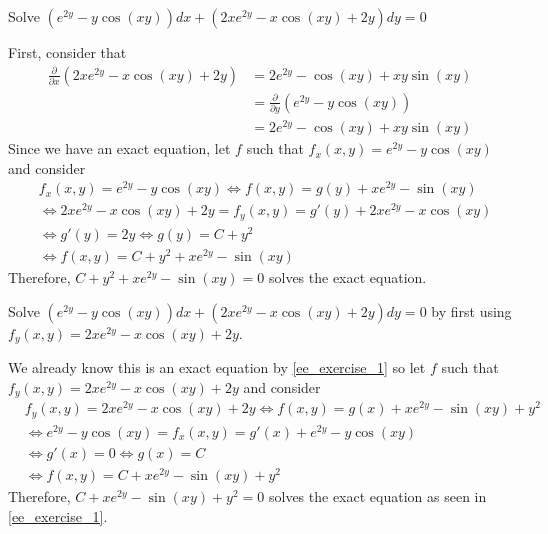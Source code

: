 \documentclass[notes]{subfiles}
\begin{document}
\begin{exercise} \label{ee_exercise_1}
    Solve $(e^{2y} - y\cos(xy))dx + (2xe^{2y} - x\cos(xy) + 2y)dy = 0$
\end{exercise}
\begin{solution}
    First, consider that
    \begin{align*}
        \frac{\partial}{\partial x} (2xe^{2y} - x\cos(xy) + 2y)
        &= 2e^{2y} - \cos(xy) + xy\sin(xy) \\
        &= \frac{\partial}{\partial y} (e^{2y} - y\cos(xy)) \\
        &= 2e^{2y} - \cos(xy) + xy\sin(xy)
    \end{align*}
    Since we have an exact equation, let $f$ such that $f_x(x, y) = e^{2y} - y\cos(xy)$ and consider
    \begin{align*}
        &f_x(x, y) = e^{2y} - y\cos(xy)
        \iff f(x, y) = g(y) + x e^{2y} - \sin(xy) \\
        &\iff 2xe^{2y} - x\cos(xy) + 2y = f_y(x, y) = g'(y) + 2x e^{2y} - x\cos(xy) \\
        &\iff g'(y) = 2y
        \iff g(y) = C + y^2 \\
        &\iff f(x, y) = C + y^2 + x e^{2y} - \sin(xy)
    \end{align*}
    Therefore, $C + y^2 + x e^{2y} - \sin(xy) = 0$ solves the exact equation.
\end{solution}

\begin{exercise}
    Solve $(e^{2y} - y\cos(xy))dx + (2xe^{2y} - x\cos(xy) + 2y)dy = 0$ by first using $f_y(x, y) = 2xe^{2y} - x\cos(xy) + 2y$.
\end{exercise}
\begin{solution}
    We already know this is an exact equation by \cref{ee_exercise_1} so let $f$ such that $f_y(x, y) = 2xe^{2y} - x\cos(xy) + 2y$ and consider
    \begin{align*}
        &f_y(x, y) = 2xe^{2y} - x\cos(xy) + 2y
        \iff f(x, y) = g(x) + xe^{2y} - \sin(xy) + y^2 \\
        &\iff e^{2y} - y\cos(xy) = f_x(x, y) = g'(x) + e^{2y} - y\cos(xy) \\
        &\iff g'(x) = 0
        \iff g(x) = C \\
        &\iff f(x, y) = C + xe^{2y} - \sin(xy) + y^2
    \end{align*}
    Therefore, $C + xe^{2y} - \sin(xy) + y^2 = 0$ solves the exact equation as seen in \cref{ee_exercise_1}.
\end{solution}
\end{document}
